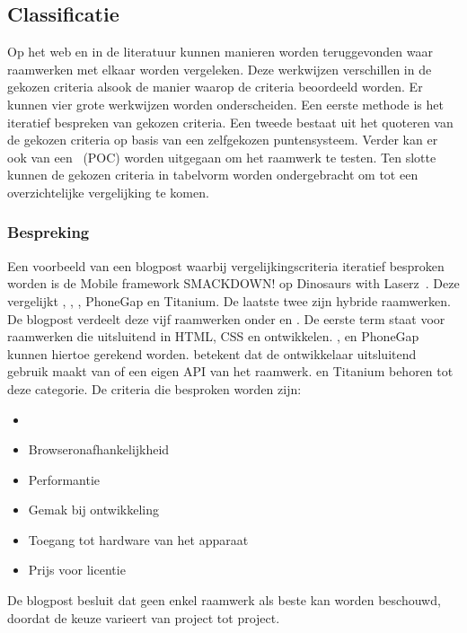 \subsection{Classificatie}
\label{sec:vergelijken-classificatie}
Op het web en in de literatuur kunnen manieren worden teruggevonden waar raamwerken met elkaar worden vergeleken.  
Deze werkwijzen verschillen in de gekozen criteria alsook de manier waarop de criteria beoordeeld worden.
Er kunnen vier grote werkwijzen worden onderscheiden.
Een eerste methode is het iteratief bespreken van gekozen criteria.
Een tweede bestaat uit het quoteren van de gekozen criteria op basis van een zelfgekozen puntensysteem.
Verder kan er ook van een ~(POC) worden uitgegaan om het raamwerk te testen.
Ten slotte kunnen de gekozen criteria in tabelvorm worden ondergebracht om tot een overzichtelijke vergelijking te komen.

\subsubsection{Bespreking}
\label{sec:manier-bespreken}
Een voorbeeld van een blogpost waarbij vergelijkingscriteria iteratief besproken worden is de Mobile framework SMACKDOWN! op Dinosaurs with Laserz~\cite{Rozynski2011}.
Deze vergelijkt \jqt{},  \jqm{},  \st{},  PhoneGap en Titanium.  
De laatste twee zijn hybride raamwerken.
De blogpost verdeelt deze vijf raamwerken onder  en .
De eerste term staat voor raamwerken die uitsluitend in HTML, CSS en \js{} ontwikkelen. 
\jqt{},  \jqm{} en PhoneGap kunnen hiertoe gerekend worden.
 betekent dat de ontwikkelaar uitsluitend gebruik maakt van \js{} of een eigen API van het raamwerk.
\st{} en Titanium behoren tot deze categorie.
De criteria die besproken worden zijn:
\begin{itemize}
 \item {}
 \item Browseronafhankelijkheid
 \item Performantie
 \item Gemak bij ontwikkeling
 \item Toegang tot hardware van het apparaat
 \item Prijs voor licentie
\end{itemize}

De blogpost besluit dat geen enkel raamwerk als beste kan worden beschouwd, doordat de keuze varieert van project tot project.

